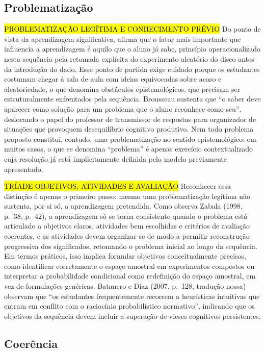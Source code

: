 {\subsection{Problematização}

\hl{PROBLEMATIZAÇÃO LEGÍTIMA E CONHECIMENTO PRÉVIO} Do ponto de vista da aprendizagem significativa,  afirma que o fator mais importante que influencia a aprendizagem é aquilo que o aluno já sabe, princípio operacionalizado nesta sequência pela retomada explícita do experimento aleatório do disco antes da introdução do dado. Esse ponto de partida exige cuidado porque os estudantes costumam chegar à sala de aula com ideias equivocadas sobre acaso e aleatoriedade, o que  denomina obstáculos epistemológicos, que precisam ser estruturalmente enfrentados pela sequência. Brousseau \cite[p.~22-23, tradução nossa]{brousseau1997} sustenta que ``o saber deve aparecer como solução para um problema que o aluno reconhece como seu'', deslocando o papel do professor de transmissor de respostas para organizador de situações que provoquem desequilíbrio cognitivo produtivo. Nem todo problema proposto constitui, contudo, uma problematização no sentido epistemológico: em muitos casos, o que se denomina ``problema'' é apenas exercício contextualizado cuja resolução já está implicitamente definida pelo modelo previamente apresentado.

\hl {TRÍADE OBJETIVOS, ATIVIDADES E AVALIAÇÃO} Reconhecer essa distinção é apenas o primeiro passo: mesmo uma problematização legítima não sustenta, por si só, a aprendizagem pretendida. Como observa Zabala (1998, p.~38, p.~42), a aprendizagem só se torna consistente quando o problema está articulado a objetivos claros, atividades bem escolhidas e critérios de avaliação coerentes, e as atividades devem organizar-se de modo a permitir reconstrução progressiva dos significados, retomando o problema inicial ao longo da sequência. Em termos práticos, isso implica formular objetivos conceitualmente precisos, como identificar corretamente o espaço amostral em experimentos compostos ou interpretar a probabilidade condicional como redefinição do espaço amostral, em vez de formulações genéricas. Batanero e Díaz (2007, p.~128, tradução nossa) observam que ``os estudantes frequentemente recorrem a heurísticas intuitivas que entram em conflito com o raciocínio probabilístico normativo'', indicando que os objetivos da sequência devem incluir a superação de vieses cognitivos persistentes.

\subsection{Coerência}

}
